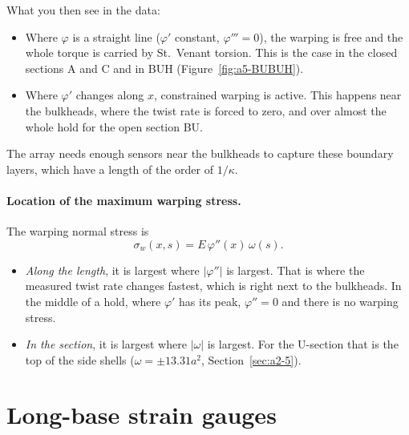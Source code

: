 What you then see in the data:
\begin{itemize}
  \item Where $\varphi$ is a straight line ($\varphi'$ constant, $\varphi''' = 0$), the warping is free and the whole torque is carried by St.\ Venant torsion. This is the case in the closed sections A and C and in BUH (Figure~\ref{fig:a5-BUBUH}).
  \item Where $\varphi'$ changes along $x$, constrained warping is active. This happens near the bulkheads, where the twist rate is forced to zero, and over almost the whole hold for the open section BU.
\end{itemize}
The array needs enough sensors near the bulkheads to capture these boundary layers, which have a length of the order of $1/\kappa$.

\paragraph{Location of the maximum warping stress.} The warping normal stress is
\begin{equation}
  \sigma_{w}(x,s) = E\,\varphi''(x)\,\omega(s).
\end{equation}
\begin{itemize}
  \item \emph{Along the length}, it is largest where $|\varphi''|$ is largest. That is where the measured twist rate changes fastest, which is right next to the bulkheads. In the middle of a hold, where $\varphi'$ has its peak, $\varphi''=0$ and there is no warping stress.
  \item \emph{In the section}, it is largest where $|\omega|$ is largest. For the U-section that is the top of the side shells ($\omega = \pm13.31a^2$, Section~\ref{sec:a2-5}).
\end{itemize}


\section{Long-base strain gauges}
\label{sec:a7-2}


